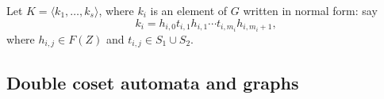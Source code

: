 \documentclass[a4paper,12pt]{article}
\newcommand{\G}{\Gamma }
\renewcommand{\i}{\iota }
\newtheorem{definition}[theorem]{Definition}
\numberwithin{equation}{section}
\numberwithin{figure}{section}
\newcommand{\ZZ}{\ensuremath{\mathbb{Z}}}
\newcommand{\la}{\langle}
\newcommand{\ra}{\rangle}
\newcommand{\maps}{\rightarrow}
\newcommand{\bs}{\backslash}
\newcommand{\be}{\begin{enumerate}}
\newcommand{\ee}{\end{enumerate}}
\begin{document}
Let $K=\la k_1, \ldots , k_s\ra$, where $k_i$ is an element of $G$
written in normal form: say
\begin{equation}\label{eq:k-form}
k_i= h_{i,0}t_{i,1}h_{i,1}\cdots t_{i,m_i}h_{i,m_i+1},
\end{equation}
where $h_{i,j}\in F(Z)$ and $t_{i,j}\in S_1\cup S_2$.

\subsection{Double coset automata and graphs}

\end{document}

